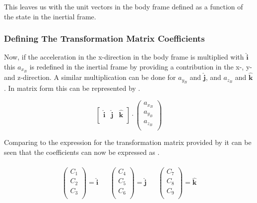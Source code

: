 \noindent
This leaves us with the unit vectors in the body frame defined as a function of the state in the inertial frame. 

\subsubsection{Defining The Transformation Matrix Coefficients}
\label{subsubsec:filTransMat}
Now, if the acceleration in the x-direction in the body frame is multiplied with $\mathbf{\hat{i}}$ this $a_{x_{B}}$ is redefined in the inertial frame by providing a contribution in the x-, y- and z-direction. A similar multiplication can be done for $a_{y_{B}}$ and $\mathbf{\hat{j}}$, and $a_{z_{B}}$ and $\mathbf{\hat{k}}$. In matrix form this can be represented by .

\begin{equation} \label{eq:firstFillEx}
\left[
\begin{matrix}
\mathbf{\hat{i}} &
\mathbf{\hat{j}} &
\mathbf{\hat{k}} \\
\end{matrix}
\right]
\cdot
\begin{pmatrix}
a_{x_{B}} \\
a_{y_{B}} \\
a_{z_{B}} \\
\end{pmatrix}
\end{equation}

\noindent
Comparing  to the expression for the transformation matrix provided by  it can be seen that the coefficients can now be expressed as .

\begin{align} \label{eq:transCoeff}
\begin{split}
\begin{pmatrix}
C_{1} \\
C_{2} \\
C_{3} \\
\end{pmatrix}
=
\mathbf{\hat{i}}
\end{split}
&
\begin{split}
\begin{pmatrix}
C_{4} \\
C_{5} \\
C_{6} \\
\end{pmatrix}
=
\mathbf{\hat{j}}
\end{split}
&
\begin{split}
\begin{pmatrix}
C_{7} \\
C_{8} \\
C_{9} \\
\end{pmatrix}
=
\mathbf{\hat{k}}
\end{split}
\end{align}

